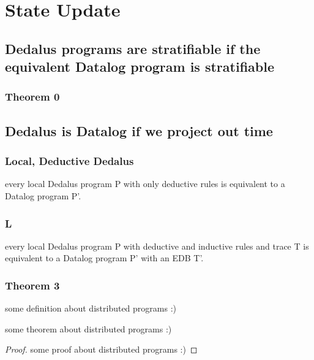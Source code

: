 \section{State Update}

\subsection{Dedalus programs are stratifiable if the equivalent Datalog program is stratifiable}

\subsubsection{Theorem 0}

\subsection{Dedalus is Datalog if we project out time}

\subsubsection{Local, Deductive Dedalus}

every local Dedalus program P with only deductive rules is equivalent to a Datalog program P'.

\subsubsection{L}

every local Dedalus program P with deductive and inductive rules and trace T is equivalent to a Datalog program P' with an EDB T'.

\subsubsection{Theorem 3}

\begin{definition}
some definition about distributed programs :)
\end{definition}

\begin{theorem}
some theorem about distributed programs :)
\end{theorem}

\begin{proof}
some proof about distributed programs :)
\end{proof}

